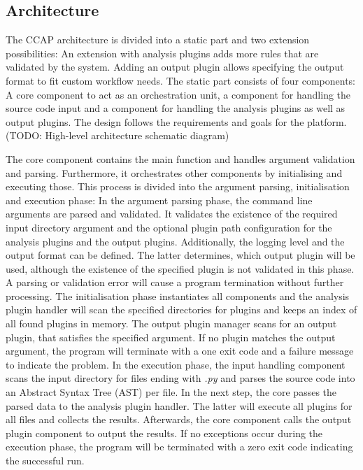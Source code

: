 \subsection{Architecture}
The CCAP architecture is divided into a static part and two extension possibilities: An extension with analysis plugins adds more rules that are validated by the system. Adding an output plugin allows specifying the output format to fit custom workflow needs.
The static part consists of four components: A core component to act as an orchestration unit, a  component for handling the source code input and a component for handling the analysis plugins as well as output plugins. The design follows the requirements and goals for the platform. 
(TODO: High-level architecture schematic diagram)

The core component contains the main function and handles argument validation and parsing. Furthermore, it orchestrates other components by initialising and executing those. This process is divided into the argument parsing, initialisation and execution phase:
In the argument parsing phase, the command line arguments are parsed and validated. It validates the existence of the required input directory argument and the optional plugin path configuration for the analysis plugins and the output plugins. Additionally, the logging level and the output format can be defined. The latter determines, which output plugin will be used, although the existence of the specified plugin is not validated in this phase. A parsing or validation error will cause a program termination without further processing.
The initialisation phase instantiates all components and the analysis plugin handler will scan the specified directories for plugins and keeps an index of all found plugins in memory. The output plugin manager scans for an output plugin, that satisfies the specified argument. If no plugin matches the output argument, the program will terminate with a one exit code and a failure message to indicate the problem.
In the execution phase, the input handling component scans the input directory for files ending with \textit{.py} and parses the source code into an Abstract Syntax Tree (AST) per file. In the next step, the core passes the parsed data to the analysis plugin handler. The latter will execute all plugins for all files and collects the results. Afterwards, the core component calls the output plugin component to output the results. If no exceptions occur during the execution phase, the program will be terminated with a zero exit code indicating the successful run.


